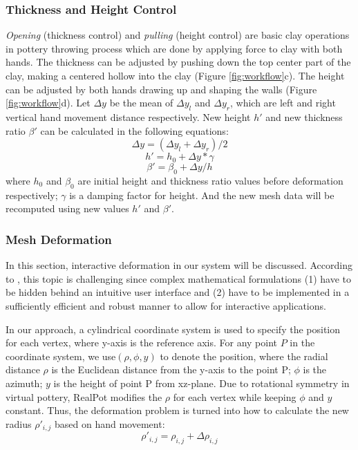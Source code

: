\documentclass{svjour3}                     %
\begin{document}
\subsubsection{Thickness and Height Control}
\label{sec:thickness}
\textit{Opening} (thickness control) and \textit{pulling} (height control) are basic clay operations in pottery throwing process which are done by applying force to clay with both hands. The thickness can be adjusted by pushing down the top center part of the clay, making a centered hollow into the clay (Figure \ref{fig:workflow}c). The height can be adjusted by both hands drawing up and shaping the walls (Figure \ref{fig:workflow}d).
Let $\Delta y$ be the mean of $\Delta y_{l}$ and $\Delta y_{r}$, which are left and right vertical hand movement distance respectively. New height $h'$ and new thickness ratio $\beta'$ can be calculated in the following equations:
\begin{equation}
\Delta y = (\Delta y_{l} + \Delta y_{r})/2
\end{equation}
\begin{equation}
h' = h_{0} + \Delta y * \gamma
\end{equation}
\begin{equation}
\beta' = \beta_{0} + \Delta y/ h
\end{equation}
where $h_{0}$ and $\beta_{0}$ are initial height and thickness ratio values before deformation respectively; $\gamma$ is a damping factor for height. And the new mesh data will be recomputed using new values $h'$ and $\beta'$.

\subsubsection{Mesh Deformation}
\label{sec:deformation}
In this section, interactive deformation in our system will be discussed. According to \cite{botsch2010polygon}, this topic is challenging since complex mathematical formulations (1) have to be hidden behind an intuitive user interface and (2) have to be implemented in a sufficiently efficient and robust manner to allow for interactive applications.

In our approach, a cylindrical coordinate system is used to specify the position for each vertex, where y-axis is the reference axis. For any point $P$ in the coordinate system, we use$(\rho, \phi, y)$ to denote the position, where the radial distance $\rho$ is the Euclidean distance from the y-axis to the point P; $\phi$ is the azimuth; $y$ is the height of point P from xz-plane.
Due to rotational symmetry in virtual pottery, RealPot modifies the $\rho$ for each vertex while keeping $\phi$ and $y$ constant. Thus, the deformation problem is turned into how to calculate the new radius $\rho'_{i,j}$ based on hand movement:
\begin{equation}
\rho'_{i,j} = \rho_{i,j} + \Delta \rho_{i,j}
\end{equation}
\end{document}
